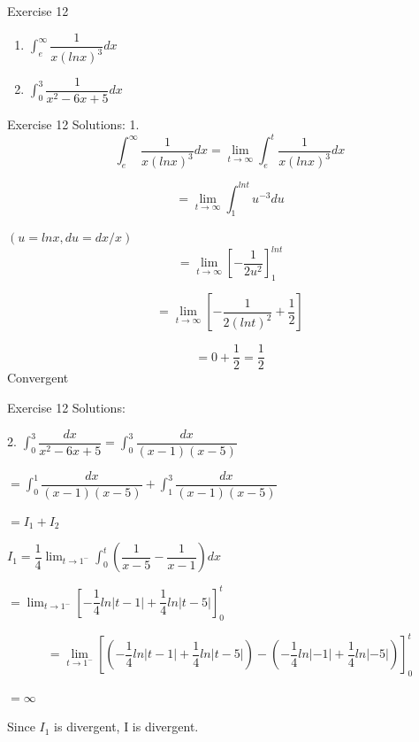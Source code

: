 \begin{frame}{Exercise 12}
    \begin{enumerate}
        \item $\int_{e}^{\infty}\dfrac{1}{x(lnx)^3}dx$
        \item $\int_{0}^{3}\dfrac{1}{x^2 - 6x + 5}dx$
    \end{enumerate}
\end{frame}

\begin{frame}{Exercise 12}
    Solutions:
    \small
    1.
    \begin{equation*}
        \int_{e}^{\infty}\dfrac{1}{x(lnx)^3}dx = \lim_{t\rightarrow \infty}\int_{e}^{t}\dfrac{1}{x(lnx)^3}dx
    \end{equation*}

    \begin{equation*}
        = \lim_{t \rightarrow \infty}\int_{1}^{lnt} u^{-3}du
    \end{equation*}

    $(u = lnx, du = dx/x)$
    \begin{equation*}
        = \lim_{t\rightarrow \infty} \left[-\dfrac{1}{2u^2}\right]_1^{lnt}
    \end{equation*}

    \begin{equation*}
        = \lim_{t\rightarrow \infty}\left[-\dfrac{1}{2(lnt)^2} + \dfrac{1}{2}\right]
    \end{equation*}

    \begin{equation*}
        = 0 + \dfrac{1}{2} = \dfrac{1}{2}
    \end{equation*}
    Convergent
    \normalsize
\end{frame}


\begin{frame}{Exercise 12}
    Solutions:

    2. $\int_{0}^{3}\dfrac{dx}{x^2 - 6x + 5} = \int_{0}^{3} \dfrac{dx}{(x-1)(x-5)}$

    $= \int_{0}^{1}\dfrac{dx}{(x-1)(x-5)} + \int_{1}^{3}\dfrac{dx}{(x-1)(x-5)}$

    $= I_1 + I_2$

    $I_1 = \dfrac{1}{4}\lim_{t\rightarrow1^-}\int_0^t \left(\dfrac{1}{x-5} - \dfrac{1}{x-1}\right)dx$

    $= \lim_{t\rightarrow1^-}\left[-\dfrac{1}{4}ln|t-1| + \dfrac{1}{4}ln|t-5|\right]_0^t$

    \begin{equation*}
        = \lim_{t\rightarrow1^-}\left[\left(-\dfrac{1}{4}ln|t-1| + \dfrac{1}{4}ln|t-5|\right) - \left(-\dfrac{1}{4}ln|-1| + \dfrac{1}{4}ln|-5|\right)\right]_0^t
    \end{equation*}

    $= \infty$

    Since $I_1$ is divergent, I is divergent.
\end{frame}

